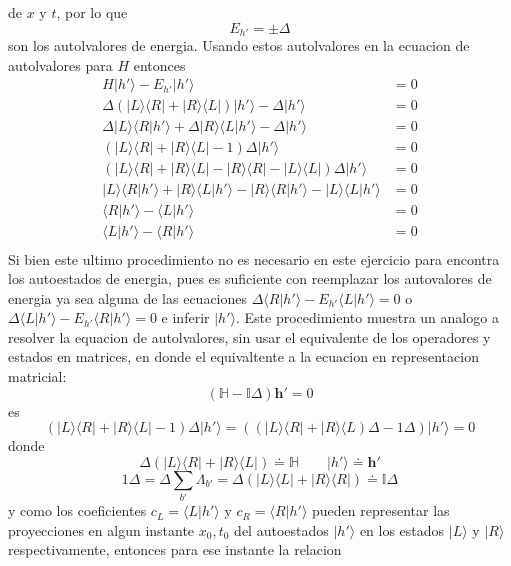 \documentclass[a4paper]{article}
\begin{document}
\begin{answer}
\begin{itemize}
        de $x$ y $t$, por lo que 
        $$E_{h'} = \pm \Delta$$
        son los autolvalores de energia. Usando estos autolvalores en la ecuacion de autolvalores para $H$ entonces
        \begin{align*}
            H|h'\rangle - E_{h'}|h'\rangle &= 0 \\
            \Delta(|L\rangle \langle R|+|R\rangle \langle L|)|h'\rangle - \Delta|h'\rangle &= 0 \\
            \Delta|L\rangle \langle R|h'\rangle + \Delta|R\rangle \langle L|h'\rangle - \Delta|h'\rangle &= 0 \\
            \left(
                |L\rangle \langle R|+|R\rangle \langle L| - 1
            \right) \Delta|h'\rangle &= 0 \\
            \left(
                |L\rangle \langle R|+|R\rangle \langle L| - |R\rangle \langle R| - |L\rangle \langle L|
            \right) \Delta |h'\rangle &= 0 \\
            |L\rangle \langle R|h'\rangle +|R\rangle \langle L|h'\rangle  - |R\rangle \langle R|h'\rangle  - |L\rangle \langle L| h'\rangle &= 0 \\
            \langle R|h'\rangle - \langle L| h'\rangle &= 0 \\
            \langle L|h'\rangle - \langle R| h'\rangle &= 0 \\
        \end{align*}
        Si bien este ultimo procedimiento no es necesario en este ejercicio para encontra los autoestados de energia, pues es suficiente con
        reemplazar los autovalores de energia ya sea alguna de las ecuaciones $\Delta \langle R|h'\rangle - E_{h'}\langle L |h'\rangle = 0$ o
        $\Delta \langle L|h'\rangle - E_{h'}\langle R |h'\rangle = 0$ e inferir $|h'\rangle$. Este procedimiento muestra un analogo a resolver
        la equacion de autolvalores, sin usar el equivalente de los operadores y estados en matrices, en donde el equivaltente a la ecuacion en
        representacion matricial:
        $$ (\mathbb H - \mathbb I \Delta) \mathbf h' = 0$$
        es 
        $$
        \left(|L\rangle \langle R|+|R\rangle \langle L| - 1
        \right) \Delta|h'\rangle = \left((|L\rangle \langle R|+|R\rangle \langle L)\Delta - 1\Delta
        \right) |h'\rangle = 0$$
        donde
        $$\Delta(|L\rangle \langle R|+|R\rangle \langle L|) \doteq \mathbb{H} \qquad |h'\rangle \doteq \mathbf h'$$
        $$1\Delta = \Delta\sum_{b'} \Lambda_{b'} = \Delta(|L\rangle \langle L| + |R\rangle \langle R|) \doteq \mathbb{I}\Delta$$
        y como los coeficientes $c_L = \langle L| h'\rangle$ y $c_R = \langle R| h'\rangle$ pueden representar las proyecciones en algun 
        instante $x_0,t_0$ del autoestados $|h'\rangle$ en los estados $|L\rangle$ y $|R\rangle$ respectivamente, entonces para ese 
        instante la relacion 
    

\end{itemize}
\end{answer}
\end{document}
